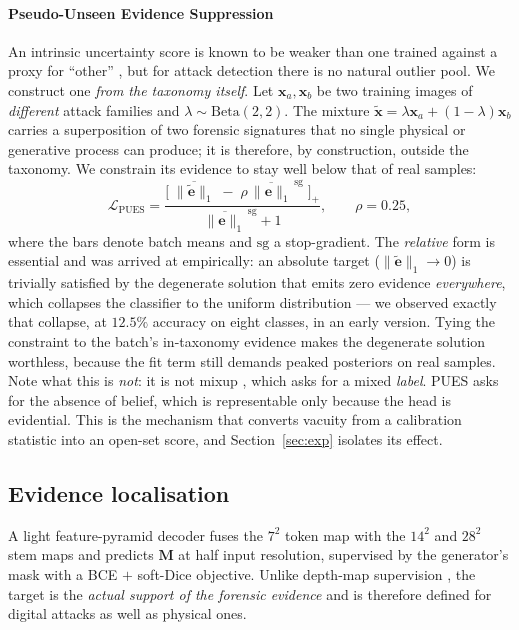 \documentclass[conference]{IEEEtran}
\newcommand{\bs}[1]{\boldsymbol{#1}}
\begin{document}
\paragraph{Pseudo-Unseen Evidence Suppression}
An intrinsic uncertainty score is known to be weaker than one trained against a
proxy for ``other'' \cite{hendrycks2019oe}, but for attack detection there is no
natural outlier pool. We construct one \emph{from the taxonomy itself}. Let
$\bs{x}_{a},\bs{x}_{b}$ be two training images of \emph{different} attack families
and $\lambda\sim\mathrm{Beta}(2,2)$. The mixture
$\tilde{\bs{x}}=\lambda\bs{x}_{a}+(1-\lambda)\bs{x}_{b}$ carries a superposition of
two forensic signatures that no single physical or generative process can produce;
it is therefore, by construction, outside the taxonomy. We constrain its evidence to stay well below that of real samples:
\begin{equation}
\mathcal{L}_{\text{PUES}} =
\frac{\bigl[\;\overline{\lVert\tilde{\bs{e}}\rVert_{1}}
      \;-\;\rho\,\overline{\lVert\bs{e}\rVert_{1}}^{\,\text{sg}}\;\bigr]_{+}}
     {\overline{\lVert\bs{e}\rVert_{1}}^{\,\text{sg}}+1},
\qquad \rho = 0.25,
\end{equation}
where the bars denote batch means and $\text{sg}$ a stop-gradient. The
\emph{relative} form is essential and was arrived at empirically: an absolute
target ($\lVert\tilde{\bs{e}}\rVert_{1}\!\to\!0$) is trivially satisfied by the
degenerate solution that emits zero evidence \emph{everywhere}, which collapses the
classifier to the uniform distribution --- we observed exactly that collapse, at
$12.5\%$ accuracy on eight classes, in an early version. Tying the constraint to
the batch's in-taxonomy evidence makes the degenerate solution worthless, because
the fit term still demands peaked posteriors on real samples.
Note what this is \emph{not}: it is not mixup \cite{zhang2018mixup}, which asks for a
mixed \emph{label}. PUES asks for the absence of belief, which is representable only
because the head is evidential. This is the mechanism that converts vacuity from a
calibration statistic into an open-set score, and Section~\ref{sec:exp} isolates its
effect.

\subsection{Evidence localisation}
A light feature-pyramid decoder fuses the $7^{2}$ token map with the $14^{2}$ and
$28^{2}$ stem maps and predicts $\bs{M}$ at half input resolution, supervised by the
generator's mask with a BCE $+$ soft-Dice objective. Unlike depth-map supervision
\cite{liu2018auxiliary,yu2021revisiting}, the target is the \emph{actual support of
the forensic evidence} and is therefore defined for digital attacks as well as
physical ones.
\end{document}
